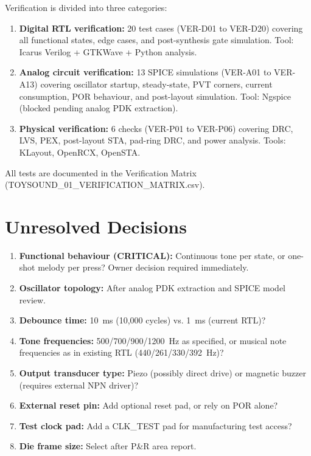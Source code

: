 \documentclass[11pt,a4paper]{article}
\begin{document}
Verification is divided into three categories:

\begin{enumerate}
  \item \textbf{Digital RTL verification:} 20 test cases (VER-D01 to VER-D20) covering
    all functional states, edge cases, and post-synthesis gate simulation.
    Tool: Icarus Verilog + GTKWave + Python analysis.

  \item \textbf{Analog circuit verification:} 13 SPICE simulations (VER-A01 to VER-A13) covering
    oscillator startup, steady-state, PVT corners, current consumption, POR behaviour, and
    post-layout simulation.
    Tool: Ngspice (blocked pending analog PDK extraction).

  \item \textbf{Physical verification:} 6 checks (VER-P01 to VER-P06) covering DRC, LVS, PEX,
    post-layout STA, pad-ring DRC, and power analysis.
    Tools: KLayout, OpenRCX, OpenSTA.
\end{enumerate}

All tests are documented in the Verification Matrix (TOYSOUND\_01\_VERIFICATION\_MATRIX.csv).

\section{Unresolved Decisions}

\begin{enumerate}[label=\textbf{UD-\arabic*.}]
  \item \textbf{Functional behaviour (CRITICAL):} Continuous tone per state, or one-shot
    melody per press? Owner decision required immediately.
  \item \textbf{Oscillator topology:} After analog PDK extraction and SPICE model review.
  \item \textbf{Debounce time:} 10~ms (10,000 cycles) vs. 1~ms (current RTL)?
  \item \textbf{Tone frequencies:} 500/700/900/1200~Hz as specified, or musical note
    frequencies as in existing RTL (440/261/330/392~Hz)?
  \item \textbf{Output transducer type:} Piezo (possibly direct drive) or magnetic buzzer
    (requires external NPN driver)?
  \item \textbf{External reset pin:} Add optional reset pad, or rely on POR alone?
  \item \textbf{Test clock pad:} Add a CLK\_TEST pad for manufacturing test access?
  \item \textbf{Die frame size:} Select after P\&R area report.
\end{enumerate}
\end{document}
